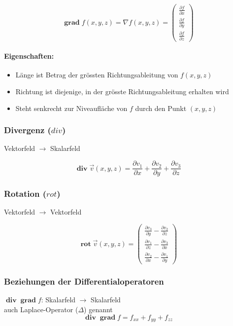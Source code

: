 \documentclass[12pt]{article}
\DeclareMathOperator{\grad}{\mathbf{grad}}
\DeclareMathOperator{\divergenz}{\mathbf{div}}
\DeclareMathOperator{\rot}{\mathbf{rot}}
\begin{document}
\begin{multicols*}{3}
					\[
						\grad f(x,y,z) = \nabla f(x,y,z) = \left(\begin{array}{c}
							\frac{\partial f}{\partial x} \\ [2pt]
							\frac{\partial f}{\partial y} \\ [2pt]
							\frac{\partial f}{\partial z}
						\end{array}\right)
					\]
					
					\paragraph{Eigenschaften:} %
						\begin{itemize}
							\item Länge ist Betrag der grössten Richtungsableitung von $f(x,y,z)$
							\item Richtung ist diejenige, in der grösste Richtungsableitung erhalten wird
							\item Steht senkrecht zur Niveaufläche von $f$ durch den Punkt $(x,y,z)$
						\end{itemize}
				\subsubsection{Divergenz ($div$)} %
					Vektorfeld $\rightarrow$ Skalarfeld
					
					\[
						\divergenz \vec{v}(x,y,z) = \frac{\partial v_1}{\partial x} + \frac{\partial v_2}{\partial y} + \frac{\partial v_3}{\partial z}
					\]
				\subsubsection{Rotation ($rot$)} %
					Vektorfeld $\rightarrow$ Vektorfeld
					
					\[
						\rot \vec{v}(x,y,z) = \left( \begin{array}{c}
							\frac{\partial v_3}{\partial y} - \frac{\partial v_2}{\partial z} \\ [2pt]
							\frac{\partial v_1}{\partial z} - \frac{\partial v_3}{\partial x} \\ [2pt]
							\frac{\partial v_2}{\partial x} - \frac{\partial v_1}{\partial y}
						\end{array} \right)
					\]
				\subsubsection{Beziehungen der Differentialoperatoren} %
					$\divergenz \grad f$: Skalarfeld $\rightarrow$ Skalarfeld \\
					auch Laplace-Operator ($\Delta$) genannt
					\[
						\divergenz \grad f = f_{xx} + f_{yy} + f_{zz}
					\]


\end{multicols*}
\end{document}
